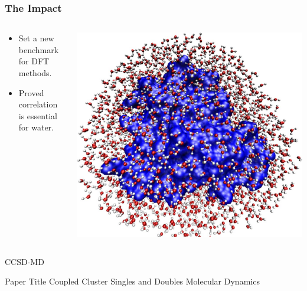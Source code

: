 \begin{frame}
    \frametitle{The Impact}
    \begin{columns}[T]
        \begin{column}{0.5\textwidth}
            \vspace{2cm}
            \begin{itemize}
                \item Set a new benchmark for DFT methods.
                \item Proved correlation is essential for water.
            \end{itemize}
        \end{column}
        \begin{column}{0.5\textwidth}
            \includegraphics[width=\textwidth]{images/waterMP23.png}
        \end{column}
    \end{columns}
\end{frame}


\begin{frame}{CCSD-MD}
	\begin{block}{Paper Title}
	Coupled Cluster Singles and Doubles Molecular Dynamics
	\end{block}
\end{frame}

